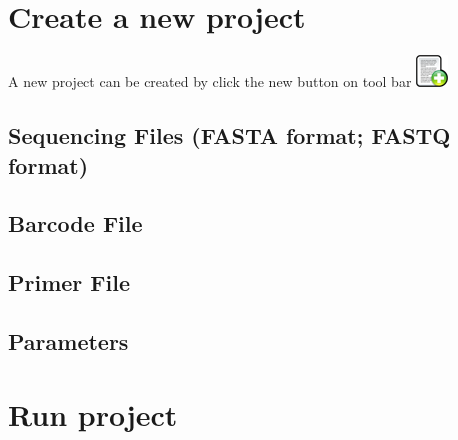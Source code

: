 \documentclass[11pt]{article}
\begin{document}
\section[Create a new project]{Create a new project}
\label{sec-3}
A new project can be created by click the new button on tool bar \includegraphics[width=.9\linewidth]{./Figures/New.png}
\subsection[Sequencing Files (FASTA format; FASTQ format)]{Sequencing Files (FASTA format; FASTQ format)}
\label{sec-3-1}
\subsection[Barcode File]{Barcode File}
\label{sec-3-2}
\subsection[Primer File]{Primer File}
\label{sec-3-3}
\subsection[Parameters]{Parameters}
\label{sec-3-4}

\section[Run project]{Run project}
\label{sec-4}
\end{document}

